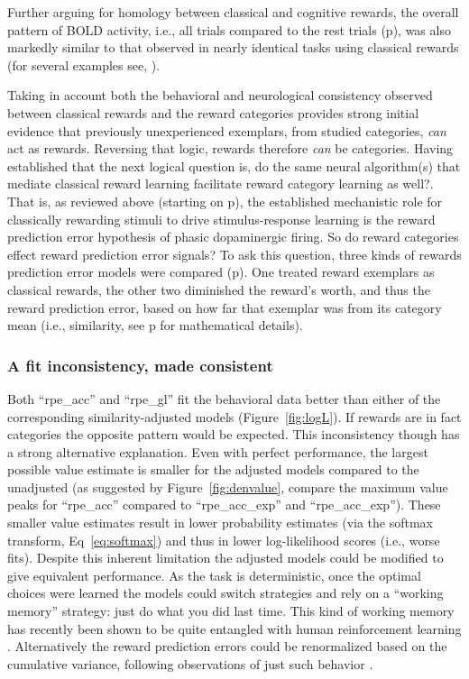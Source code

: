 Further arguing for homology between classical and cognitive rewards, the overall pattern of BOLD activity, i.e., all trials compared to the rest trials (p\pageref{sub:blob}), was also markedly similar to that observed in nearly identical tasks using classical rewards (for several examples see, \citet{LopezPaniagua:2011p8296,Seger:2010p7188,Cincotta:2007p6672,Seger:2006p5447,Seger:2005pd}).

Taking in account both the behavioral and neurological consistency observed between classical rewards and the reward categories provides strong initial evidence that previously unexperienced exemplars, from studied categories, \emph{can} act as rewards.  Reversing that logic, rewards therefore \emph{can} be categories.  Having established that the next logical question is, do the same neural algorithm(s) that mediate classical reward learning facilitate reward category learning as well?.  That is, as reviewed above (starting on p\pageref{subsub:expectations}), the established mechanistic role for classically rewarding stimuli to drive stimulus-response learning is the reward prediction error hypothesis of phasic dopaminergic firing.  So do reward categories effect reward prediction error signals?  To ask this question, three kinds of rewards prediction error models were compared (p\pageref{sub:threemodels}).  One treated reward exemplars as classical rewards, the other two diminished the reward's worth, and thus the reward prediction error, based on how far that exemplar was from its category mean (i.e., similarity, see p\pageref{subsub:incantations} for mathematical details).

\subsubsection{A fit inconsistency, made consistent}
\label{subsub:inconsistency}
Both ``rpe\_acc'' and ``rpe\_gl'' fit the behavioral data better than either of the corresponding similarity-adjusted models (Figure~\ref{fig:logL}).  If rewards are in fact categories the opposite pattern would be expected.  This inconsistency though has a strong alternative explanation.  Even with perfect performance, the largest possible value estimate is smaller for the adjusted models compared to the unadjusted (as suggested by Figure~\ref{fig:denvalue}, compare the maximum value peaks for ``rpe\_acc'' compared to ``rpe\_acc\_exp'' and ``rpe\_acc\_exp'').  These smaller value estimates result in lower probability estimates (via the softmax transform, Eq~\ref{eq:softmax}) and thus in lower log-likelihood scores (i.e., worse fits).  Despite this inherent limitation the adjusted models could be modified to give equivalent performance.  As the task is deterministic, once the optimal choices were learned the models could switch strategies and rely on a ``working memory'' strategy: just do what you did last time.  This kind of working memory has recently been shown to be quite entangled with human reinforcement learning \citep{Collins:2012p9779}.  Alternatively the reward prediction errors could be renormalized based on the cumulative variance, following observations of just such behavior \citep{Tobler:2005p6373}.

